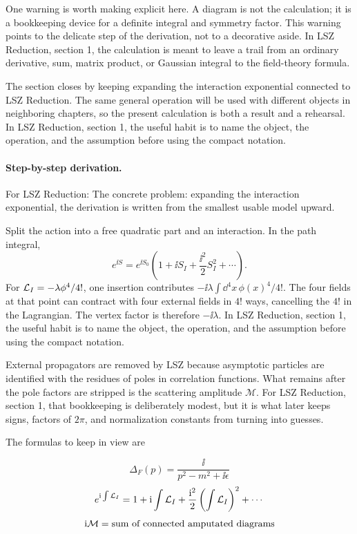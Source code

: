 One warning is worth making explicit here.  A diagram is not the calculation; it is a bookkeeping device for a definite integral and symmetry factor.  This warning points to the delicate step of the derivation, not to a decorative aside.  In LSZ Reduction, section 1, the calculation is meant to leave a trail from an ordinary derivative, sum, matrix product, or Gaussian integral to the field-theory formula.

The section closes by keeping expanding the interaction exponential connected to LSZ Reduction.  The same general operation will be used with different objects in neighboring chapters, so the present calculation is both a result and a rehearsal.  In LSZ Reduction, section 1, the useful habit is to name the object, the operation, and the assumption before using the compact notation.



\paragraph{Step-by-step derivation.}

For LSZ Reduction: The concrete problem: expanding the interaction exponential, the derivation is written from the smallest usable model upward.

Split the action into a free quadratic part and an interaction.  In the path integral,
\[
  e^{\ii S}=e^{\ii S_0}\left(1+\ii S_I+\frac{\ii^2}{2}S_I^2+\cdots\right).
\]
For \(\mathcal L_I=-\lambda\phi^4/4!\), one insertion contributes \(-\ii\lambda\int\dd^4x\,\phi(x)^4/4!\).  The four fields at that point can contract with four external fields in \(4!\) ways, cancelling the \(4!\) in the Lagrangian.  The vertex factor is therefore \(-\ii\lambda\).  In LSZ Reduction, section 1, the useful habit is to name the object, the operation, and the assumption before using the compact notation.

External propagators are removed by LSZ because asymptotic particles are identified with the residues of poles in correlation functions.  What remains after the pole factors are stripped is the scattering amplitude \(\mathcal M\).  For LSZ Reduction, section 1, that bookkeeping is deliberately modest, but it is what later keeps signs, factors of \(2\pi\), and normalization constants from turning into guesses.

The formulas to keep in view are

\[
  \Delta_F(p)=\frac{\ii}{p^2-m^2+\ii\epsilon}
\]
\[
  e^{\mathrm i\int\mathcal L_I}=1+\mathrm i\int\mathcal L_I+\frac{\mathrm i^2}{2}\left(\int\mathcal L_I\right)^2+\cdots
\]
\[
  \mathrm i\mathcal M=\hbox{sum of connected amputated diagrams}
\]

